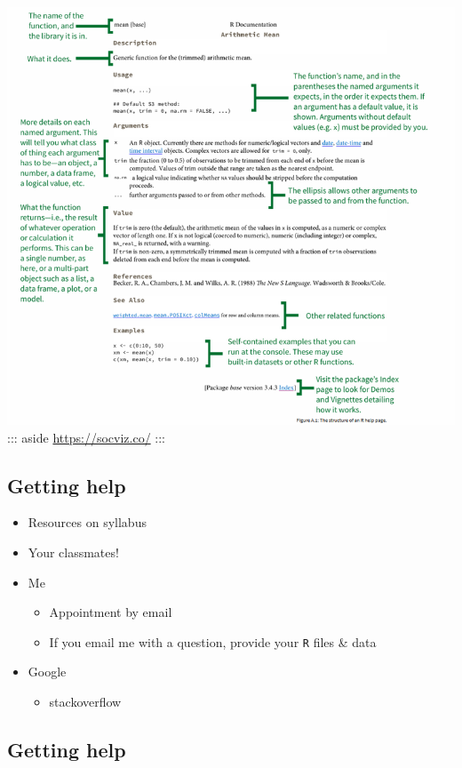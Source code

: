 \documentclass[
  letterpaper,
  DIV=11,
  numbers=noendperiod,
  oneside]{scrartcl}
\providecommand{\tightlist}{%
  \setlength{\itemsep}{0pt}\setlength{\parskip}{0pt}}\usepackage{longtable,booktabs,array}
\begin{document}
\includegraphics{./images/help_info.png} ::: aside
\url{https://socviz.co/} :::

\hypertarget{getting-help-1}{%
\subsection{Getting help}\label{getting-help-1}}

\begin{itemize}
\tightlist
\item
  Resources on syllabus
\item
  Your classmates!
\item
  Me

  \begin{itemize}
  \tightlist
  \item
    Appointment by email
  \item
    If you email me with a question, provide your \texttt{R} files \&
    data
  \end{itemize}
\item
  Google

  \begin{itemize}
  \tightlist
  \item
    stackoverflow
  \end{itemize}
\end{itemize}

\hypertarget{getting-help-2}{%
\subsection{Getting help}\label{getting-help-2}}
\end{document}

